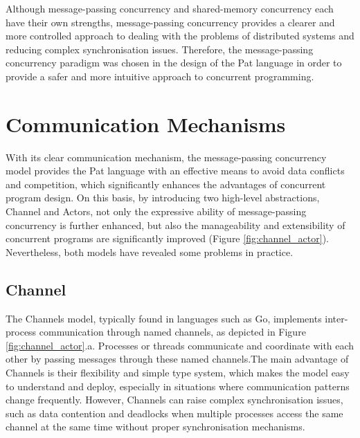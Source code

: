 \documentclass{l4proj}
\begin{document}
Although message-passing concurrency and shared-memory concurrency each have their own strengths, message-passing concurrency provides a clearer and more controlled approach to dealing with the problems of distributed systems and reducing complex synchronisation issues. Therefore, the message-passing concurrency paradigm was chosen in the design of the Pat language in order to provide a safer and more intuitive approach to concurrent programming.

\section{Communication Mechanisms}
With its clear communication mechanism, the message-passing concurrency model provides the Pat language with an effective means to avoid data conflicts and competition, which significantly enhances the advantages of concurrent program design. On this basis, by introducing two high-level abstractions, Channel and Actors, not only the expressive ability of message-passing concurrency is further enhanced, but also the manageability and extensibility of concurrent programs are significantly improved (Figure \ref{fig:channel_actor}). Nevertheless, both models have revealed some problems in practice.

\subsection{Channel}
The Channels model, typically found in languages such as Go, implements inter-process communication through named channels, as depicted in Figure \ref{fig:channel_actor}.a. Processes or threads communicate and coordinate with each other by passing messages through these named channels.The main advantage of Channels is their flexibility and simple type system, which makes the model easy to understand and deploy, especially in situations where communication patterns change frequently. However, Channels can raise complex synchronisation issues, such as data contention and deadlocks when multiple processes access the same channel at the same time without proper synchronisation mechanisms.
\end{document}
